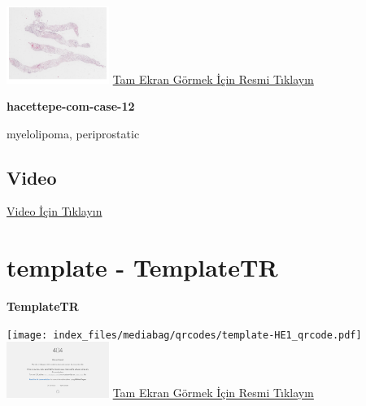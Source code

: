 \documentclass[
  letterpaper,
  DIV=11,
  numbers=noendperiod]{scrreprt}
\begin{document}
\href{https://images.patolojiatlasi.com/hacettepe-com-case-12/HE.html}{\includegraphics[width=0.25\textwidth,height=\textheight]{./screenshots/thumbnail_hacettepe-com-case-12.png}}
\href{https://images.patolojiatlasi.com/hacettepe-com-case-12/HE.html}{Tam
Ekran Görmek İçin Resmi Tıklayın}

\textbf{hacettepe-com-case-12}

\begin{tcolorbox}[enhanced jigsaw, breakable, opacitybacktitle=0.6, arc=.35mm, colbacktitle=quarto-callout-tip-color!10!white, colback=white, toptitle=1mm, left=2mm, opacityback=0, colframe=quarto-callout-tip-color-frame, titlerule=0mm, rightrule=.15mm, bottomrule=.15mm, toprule=.15mm, bottomtitle=1mm, title=\textcolor{quarto-callout-tip-color}{\faLightbulb}\hspace{0.5em}{Tanı}, coltitle=black, leftrule=.75mm]

myelolipoma, periprostatic

\end{tcolorbox}

\hypertarget{video-11}{%
\subsection{Video}\label{video-11}}

\href{https://www.youtube.com/watch?v=2TwT4sE9XmM}{Video İçin Tıklayın}

\hypertarget{sec-template}{%
\section{template - TemplateTR}\label{sec-template}}

\textbf{TemplateTR}

\texttt{[image: index\_files/mediabag/qrcodes/template-HE1\_qrcode.pdf]}
\href{https://images.patolojiatlasi.com/template/HE1.html}{\includegraphics[width=0.25\textwidth,height=\textheight]{./screenshots/thumbnail_template-HE1.png}}
\href{https://images.patolojiatlasi.com/template/HE1.html}{Tam Ekran
Görmek İçin Resmi Tıklayın}
\end{document}
